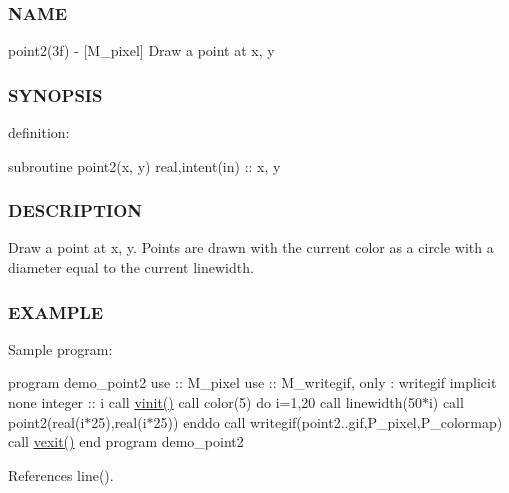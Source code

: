 \subsubsection*{N\+A\+ME}

point2(3f) -\/ \mbox{[}M\+\_\+pixel\mbox{]} Draw a point at x, y 

\subsubsection*{S\+Y\+N\+O\+P\+S\+IS}

definition\+:

subroutine point2(x, y) real,intent(in) \+:\+: x, y

\subsubsection*{D\+E\+S\+C\+R\+I\+P\+T\+I\+ON}

Draw a point at x, y. Points are drawn with the current color as a circle with a diameter equal to the current linewidth.

\subsubsection*{E\+X\+A\+M\+P\+LE}

Sample program\+:

program demo\+\_\+point2 use \+:\+: M\+\_\+pixel use \+:\+: M\+\_\+writegif, only \+: writegif implicit none integer \+:\+: i call \hyperlink{namespacem__pixel_ac03ca8f23fdadb60599b6ea4dc87a6d9}{vinit()} call color(5) do i=1,20 call linewidth(50$\ast$i) call point2(real(i$\ast$25),real(i$\ast$25)) enddo call writegif(\textquotesingle{}point2..\+gif\textquotesingle{},P\+\_\+pixel,P\+\_\+colormap) call \hyperlink{namespacem__pixel_a19ad6b65752322b0029a62cc0ebec3e8}{vexit()} end program demo\+\_\+point2 

References line().

